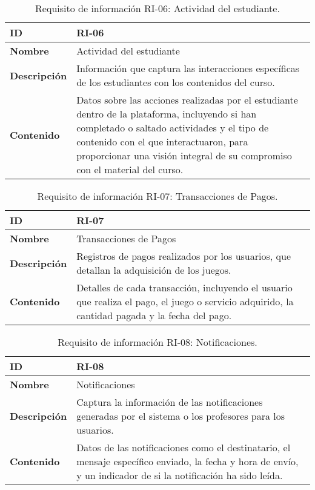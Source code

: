 \begin{table}[H]
    \centering
    \begin{tabular}{|l|p{9.5cm}|}
        \hline
        \textbf{ID} & RI-06 \\
        \hline
        \textbf{Nombre} & Actividad del estudiante \\
        \hline
        \textbf{Descripción} &  Información que captura las interacciones específicas de los estudiantes con los contenidos del curso. \\
        \hline
        \textbf{Contenido} & Datos sobre las acciones realizadas por el estudiante dentro de la plataforma, incluyendo si han completado o saltado actividades y el tipo de contenido con el que interactuaron, para proporcionar una visión integral de su compromiso con el material del curso. \\
        \hline
    \end{tabular}
    \caption{Requisito de información RI-06: Actividad del estudiante.}
    \label{table:req-RI08}
\end{table}

\begin{table}[H]
    \centering
    \begin{tabular}{|l|p{9.5cm}|}
        \hline
        \textbf{ID} & RI-07 \\
        \hline
        \textbf{Nombre} & Transacciones de Pagos \\
        \hline
        \textbf{Descripción} & Registros de pagos realizados por los usuarios, que detallan la adquisición de los juegos.  \\
        \hline
        \textbf{Contenido} & Detalles de cada transacción, incluyendo el usuario que realiza el pago, el juego o servicio adquirido, la cantidad pagada y la fecha del pago. \\
        \hline
    \end{tabular}
    \caption{Requisito de información RI-07: Transacciones de Pagos.}
    \label{table:req-RI09}
\end{table}

\begin{table}[H]
    \centering
    \begin{tabular}{|l|p{9.5cm}|}
        \hline
        \textbf{ID} & RI-08 \\
        \hline
        \textbf{Nombre} & Notificaciones \\
        \hline
        \textbf{Descripción} & Captura la información de las notificaciones generadas por el sistema o los profesores para los usuarios. \\
        \hline
        \textbf{Contenido} & Datos de las notificaciones como el destinatario, el mensaje específico enviado, la fecha y hora de envío, y un indicador de si la notificación ha sido leída. \\
        \hline
    \end{tabular}
    \caption{Requisito de información RI-08: Notificaciones.}
    \label{table:req-RI10}
\end{table}

